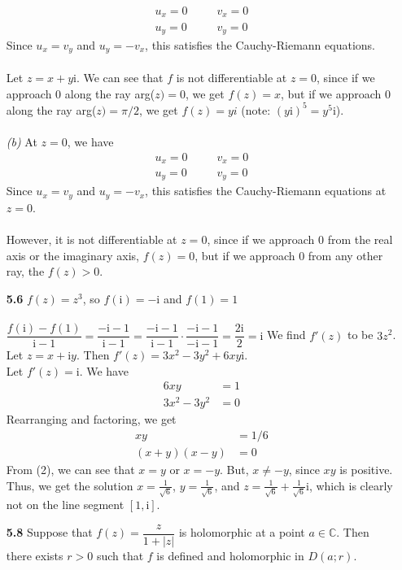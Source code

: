 \begin{enumerate}
\begin{align*}
u_x = 0 ~~~~&~~~~ v_x = 0 \\
u_y = 0 ~~~~&~~~~ v_y = 0 
\end{align*}
Since $u_x = v_y$ and $u_y = -v_x$, this satisfies the Cauchy-Riemann equations. \\\\
Let $z = x+y$i. We can see that $f$ is not differentiable at $z=0$, since if we approach 0 along the ray arg($z) = 0$, we get $f(z) = x$, but if we approach 0 along the ray arg($z) = \pi/2$, we get $f(z) = yi$ (note: $(y\mathrm{i})^5 = y^5$i). 
\\\\
\textit{(b)}
At $z=0$, we have 
\begin{align*}
u_x = 0 ~~~~&~~~~ v_x = 0 \\
u_y = 0 ~~~~&~~~~ v_y = 0 
\end{align*}
Since $u_x = v_y$ and $u_y = -v_x$, this satisfies the Cauchy-Riemann equations at $z = 0$. \\\\
However, it is not differentiable at $z=0$, since if we approach 0 from the real axis or the imaginary axis, $f(z) = 0$, but if we approach 0 from any other ray, the $f(z) > 0$. 
\item[\textbf{5.6}] 
$f(z) = z^3$, so $f(\mathrm{i}) = -\mathrm{i}$ and $f(1) = 1$ \\\\
$\dfrac{f(\mathrm{i}) - f(1)}{\mathrm{i}-1} =
\dfrac{-\mathrm{i}-1}{\mathrm{i}-1} = 
\dfrac{-\mathrm{i}-1}{\mathrm{i}-1}\cdot\dfrac{-\mathrm{i}-1}{-\mathrm{i}-1} = 
\dfrac{2\mathrm{i}}{2} = \mathrm{i}$
We find $f'(z)$ to be $3z^2$. Let $z = x+\mathrm{i}y$. Then $f'(z) = 3x^2-3y^2 + 6xy\mathrm{i}$. \\
Let $f'(z) = \mathrm{i}$. We have 
\begin{align*}
6xy &= 1 \\
3x^2 - 3y^2 &= 0
\end{align*}
Rearranging and factoring, we get
\begin{align}
xy &= 1/6 \\
(x+y)(x-y) &= 0
\end{align}
From (2), we can see that $x=y$ or $x=-y$. But, $x\ne -y$, since $xy$ is positive. Thus, we get the solution $x=\frac{1}{\sqrt{6}}$, $y=\frac{1}{\sqrt{6}}$, and $z=\frac{1}{\sqrt{6}}+\frac{1}{\sqrt{6}}\mathrm{i}$, which is clearly not on the line segment $[1,\mathrm{i}]$.     
\item[\textbf{5.8}] 
Suppose that $f(z) = \dfrac{z}{1+|z|}$ is holomorphic at a point $a\in \mathbb{C}$. Then there exists $r > 0$ such that $f$ is defined and holomorphic in $D(a;r)$. \\\\

\end{enumerate}
